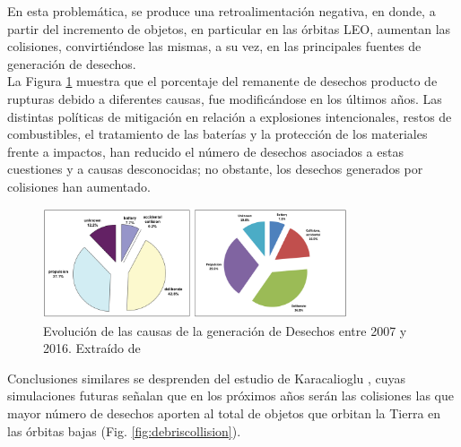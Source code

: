 En esta problem\'atica, se produce una retroalimentaci\'on negativa, en donde, a partir del incremento de objetos, en particular en las \'orbitas LEO, aumentan las colisiones, convirti\'endose las mismas, a su vez, en las principales fuentes de generaci\'on de desechos.\\ 

La Figura \ref{fig:causadesechos} muestra que el porcentaje del remanente de desechos producto de rupturas debido a diferentes causas, fue modific\'andose en los \'ultimos a\~nos. Las distintas pol\'iticas de mitigaci\'on en relaci\'on a explosiones intencionales, restos de combustibles, el tratamiento de las bater\'ias y la protecci\'on de los materiales frente a impactos, han reducido el n\'umero de desechos asociados a estas cuestiones y a causas desconocidas; no obstante, los desechos generados por colisiones han aumentado.\\

\begin{figure}[!h]
  \centering
  \includegraphics[width=0.8\textwidth]{imagenes/breakupsQNews}
  \caption[Evoluci\'on de las causas de la generaci\'on de Desechos]{Evoluci\'on de las causas de la generaci\'on de Desechos entre 2007 y 2016. Extra\'ido de \citep{ODQNum}}
  \label{fig:causadesechos}
\end{figure}

Conclusiones similares se desprenden del estudio de Karacalioglu \citep{karacalioglu2016impact}, cuyas simulaciones futuras se\~nalan que en los pr\'oximos a\~nos ser\'an las colisiones las que mayor n\'umero de desechos aporten al total de objetos que orbitan la Tierra en las \'orbitas bajas (Fig. \ref{fig:debriscollision}).\\

